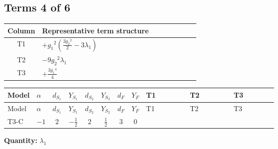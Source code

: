 \documentclass[8pt]{article}
\begin{document}
\begin{landscape}
\subsection*{Terms 4 of 6}
\begin{center}
\begin{tabular}{@{}c >{\raggedright\arraybackslash}p{0.82\linewidth}@{}}
\toprule
Column & Representative term structure \\
\midrule
T1 & \(\displaystyle +{g_1}^2 \left(\frac{3 {g_2}^2}{2}-3 {\lambda_1}\right)\) \\
\midrule
T2 & \(\displaystyle -9 {g_2}^2 {\lambda_1}\) \\
\midrule
T3 & \(\displaystyle +\frac{3 {g_1}^4}{4}\) \\
\midrule
\bottomrule
\end{tabular}
\end{center}
\smallskip
\tiny
\begin{longtable}{@{}llcccccc >{\raggedright\arraybackslash}p{0.21\linewidth} >{\raggedright\arraybackslash}p{0.21\linewidth} >{\raggedright\arraybackslash}p{0.21\linewidth}@{}}
\toprule
Model & $\alpha$ & $d_{S_1}$ & $Y_{S_1}$ & $d_{S_2}$ & $Y_{S_2}$ & $d_F$ & $Y_F$ & T1 & T2 & T3 \\
\midrule
\endfirsthead
\toprule
Model & $\alpha$ & $d_{S_1}$ & $Y_{S_1}$ & $d_{S_2}$ & $Y_{S_2}$ & $d_F$ & $Y_F$ & T1 & T2 & T3 \\
\midrule
\endhead
T3-C & $-1$ & $2$ & $-\frac{1}{2}$ & $2$ & $\frac{1}{2}$ & $3$ & $0$ & \scriptsize\adjustbox{max width=\linewidth}{$\begin{gathered} +{g_1}^2 \left(\frac{3 {g_2}^2}{2}-3 {\lambda_1}\right)\end{gathered}$} & \scriptsize\adjustbox{max width=\linewidth}{$\begin{gathered} -9 {g_2}^2 {\lambda_1}\end{gathered}$} & \scriptsize\adjustbox{max width=\linewidth}{$\begin{gathered} +\frac{3 {g_1}^4}{4}\end{gathered}$} \\
\midrule
\bottomrule
\end{longtable}
\clearpage
\noindent\textbf{Quantity: }$\lambda_1$\par\smallskip

\end{landscape}
\end{document}
